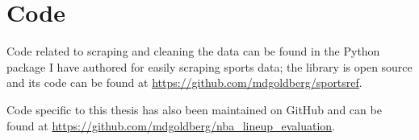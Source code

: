 \chapter{Code}
\label{AppendixA}

Code related to scraping and cleaning the data can be found in the Python package I
have authored for easily scraping sports data; the library is open source and its
code can be found at \url{https://github.com/mdgoldberg/sportsref}.

Code specific to this thesis has also been maintained on GitHub and can be found at
\url{https://github.com/mdgoldberg/nba_lineup_evaluation}.

